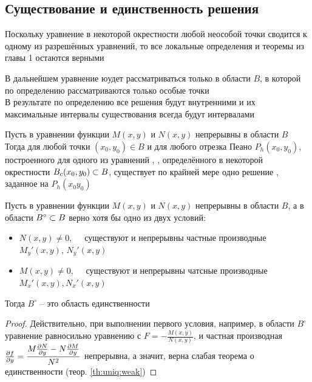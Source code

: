 \subsection{Существование и единственность решения}

Поскольку уравнение  в некоторой окрестности любой неособой точки сводится к одному из разрешённых уравнений, то все локальные определения и теоремы из главы 1 остаются верными

\begin{remark}
    В дальнейшем уравнение  юудет рассматриваться только в области $ B $, в которой по определению рассматриваются только особые точки \\
    В результате по определению все решения будут внутренними и их максимальные интервалы существования всегда будут интервалами
\end{remark}

\begin{theorem}
    Пусть в уравнении  функции $ M(x, y) $ и $ N(x, y) $ непрерывны в области $ B $ \\
    Тогда для любой точки $ (x_0, y_0) \in B $ и для любого отрезка Пеано $ P_h(x_0, y_0) $, построенного для одного из уравнений , , определённого в некоторой окрестности $ B_c(x_0, y_0) \subset B $, существует по крайней мере одно решение , заданное на $ P_h(x_0 y_0) $
\end{theorem}

\begin{theorem}
    Пусть в уравнении  функции $ M(x, y) $ и $ N(x, y) $ непрерывны в области $ B $, а в области $ B^\circ \subset B $ верно хотя бы одно из двух условий:
    \begin{itemize}
    	\item $ N(x, y) \ne 0, \quad $ существуют и непрерывны частные производные $ M_y'(x, y) $, $ N_y'(x, y) $
        \item $ M(x, y) \ne 0, \quad $ существуют и непрерывны чатсные производные $ M_x'(x, y), N_x'(x, y) $
    \end{itemize}
    Тогда $ B^\circ $ -- это область единственности
\end{theorem}

\begin{proof}
    Действительно, при выполнении первого условия, например, в области $ B^\circ $ уравнение  равносильно уравнению  с $ F = -\frac{M(x, y)}{N(x, y)} $, и частная производная $ \frac{\partial {f}}{\partial {y}} = \dfrac{M \frac{\partial {N}}{\partial {y}} - N \frac{\partial {M}}{\partial {y}}}{N^2} $ непрерывна, а значит, верна слабая теорема о единственности (теор. \ref{th:uniq:weak})
\end{proof}

